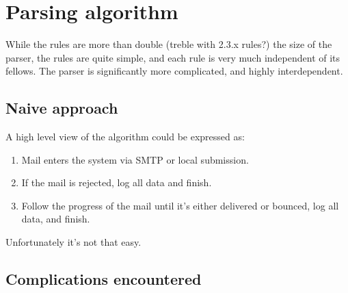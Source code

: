 \documentclass[a4paper,12pt,draft]{article}
\begin{document}
\section{Parsing algorithm}

While the rules are more than double (treble with 2.3.x rules?) the size of
the parser, the rules are quite simple, and each rule is very much
independent of its fellows.  The parser is significantly more complicated,
and highly interdependent.


\subsection{Naive approach}

A high level view of the algorithm could be expressed as:

\begin{enumerate}

    \item Mail enters the system via SMTP or local submission.

    \item If the mail is rejected, log all data and finish.

    \item Follow the progress of the mail until it's either delivered or
        bounced, log all data, and finish.

\end{enumerate}

Unfortunately it's not that easy.


\subsection{Complications encountered}
\end{document}
